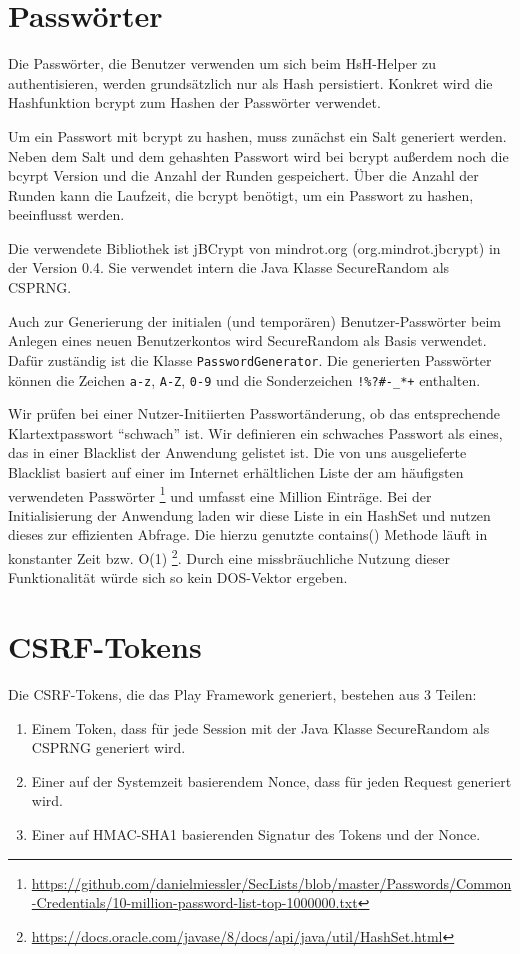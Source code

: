 \documentclass[12pt,DIV14,BCOR10mm,a4paper,parskip=half-,headsepline,headinclude,english,ngerman,bibliography=totocnumbered]{scrreprt}
\begin{document}
\section{Passwörter}
Die Passwörter, die Benutzer verwenden um sich beim HsH-Helper zu authentisieren, werden grundsätzlich nur als Hash persistiert. Konkret wird die Hashfunktion bcrypt zum Hashen der Passwörter verwendet.

Um ein Passwort mit bcrypt zu hashen, muss zunächst ein Salt generiert werden. Neben dem Salt und dem gehashten Passwort wird bei bcrypt außerdem noch die bcyrpt Version und die Anzahl der Runden gespeichert. Über die Anzahl der Runden kann die Laufzeit, die bcrypt benötigt, um ein Passwort zu hashen, beeinflusst werden.

Die verwendete Bibliothek ist jBCrypt von mindrot.org (org.mindrot.jbcrypt) in der Version 0.4. Sie verwendet intern die Java Klasse SecureRandom als CSPRNG.

Auch zur Generierung der initialen (und temporären) Benutzer-Passwörter beim Anlegen eines neuen Benutzerkontos wird SecureRandom als Basis verwendet. Dafür zuständig ist die Klasse \texttt{PasswordGenerator}. Die generierten Passwörter können die Zeichen \texttt{a-z}, \texttt{A-Z}, \texttt{0-9} und die Sonderzeichen \texttt{!\%?\#-\_*+} enthalten.

Wir prüfen bei einer Nutzer-Initiierten Passwortänderung, ob das entsprechende Klartextpasswort \enquote{schwach} ist. Wir definieren ein schwaches Passwort als eines, das in einer Blacklist der Anwendung gelistet ist. Die von uns ausgelieferte Blacklist basiert auf einer im Internet erhältlichen Liste der am häufigsten verwendeten Passwörter \footnote{\url{https://github.com/danielmiessler/SecLists/blob/master/Passwords/Common-Credentials/10-million-password-list-top-1000000.txt}} und umfasst eine Million Einträge. Bei der Initialisierung der Anwendung laden wir diese Liste in ein HashSet und nutzen dieses zur effizienten Abfrage. Die hierzu genutzte contains() Methode läuft in konstanter Zeit bzw. O(1) \footnote{\url{https://docs.oracle.com/javase/8/docs/api/java/util/HashSet.html}}. Durch eine missbräuchliche Nutzung dieser Funktionalität würde sich so kein DOS-Vektor ergeben.

\section{CSRF-Tokens}
Die CSRF-Tokens, die das Play Framework generiert, bestehen aus 3 Teilen:
\begin{enumerate}
\item Einem Token, dass für jede Session mit der Java Klasse SecureRandom als CSPRNG generiert wird.
\item Einer auf der Systemzeit basierendem Nonce, dass für jeden Request generiert wird.
\item Einer auf HMAC-SHA1 basierenden Signatur des Tokens und der Nonce.
\end{enumerate}
\end{document}

